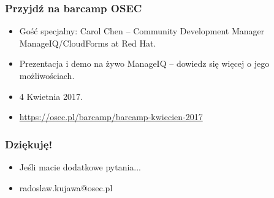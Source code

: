 \documentclass[dvipsnames,table]{beamer}
\begin{document}
\begin{frame}
\frametitle{Przyjdź na barcamp OSEC}
\begin{itemize}
	\item Gość specjalny: Carol Chen -- Community Development Manager ManageIQ/CloudForms at Red Hat.
	\item Prezentacja i demo na żywo ManageIQ -- dowiedz się więcej o jego możliwościach.
	\item 4 Kwietnia 2017.
	\item \url{https://osec.pl/barcamp/barcamp-kwiecien-2017}
\end{itemize}
\end{frame}

\begin{frame}
\frametitle{Dziękuję!}
\begin{itemize}
	\item Jeśli macie dodatkowe pytania...
	\item radoslaw.kujawa@osec.pl
\end{itemize}
\end{frame}
\end{document}
